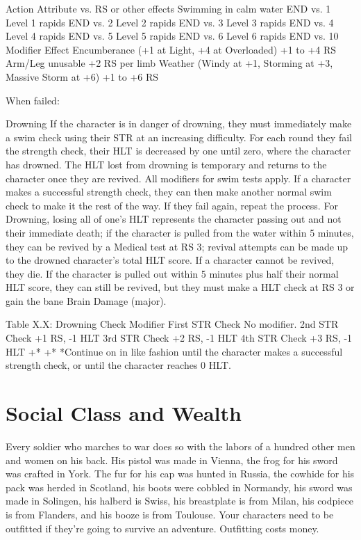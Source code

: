 \documentclass[oneside,11pt,english]{book}
\begin{document}
Action Attribute vs. RS or other effects 
Swimming in calm water END vs. 1 
Level 1 rapids END vs. 2 
Level 2 rapids END vs. 3 
Level 3 rapids END vs. 4 
Level 4 rapids END vs. 5 
Level 5 rapids END vs. 6 
Level 6 rapids END vs. 10 
Modifier Effect 
Encumberance (+1 at Light, +4 at Overloaded) +1 to +4 RS 
Arm/Leg unusable +2 RS per limb 
Weather (Windy at +1, Storming at +3, Massive Storm at +6) +1 to +6 RS 


When failed:

Drowning
If the character is in danger of drowning, they must immediately make a swim check using their STR at an increasing difficulty. For each round they fail the strength check, their HLT is decreased by one until zero, where the character has drowned. The HLT lost from drowning is temporary and returns to the character once they are revived. All modifiers for swim tests apply. If a character makes a successful strength check, they can then make another normal swim check to make it the rest of the way. If they fail again, repeat the process. For Drowning, losing all of one’s HLT represents the character passing out and not their immediate death; if the character is pulled from the water within 5 minutes, they can be revived by a Medical test at RS 3; revival attempts can be made up to the drowned character’s total HLT score. If a character cannot be revived, they die. If the character is pulled out within 5 minutes plus half their normal HLT score, they can still be revived, but they must make a HLT check at RS 3 or gain the bane Brain Damage (major).


Table X.X: Drowning %
Check Modifier 
First STR Check No modifier. 
2nd STR Check +1 RS, -1 HLT 
3rd STR Check +2 RS, -1 HLT 
4th STR Check +3 RS, -1 HLT 
+* +* 
*Continue on in like fashion until the character makes a successful strength check, or until the character 
reaches 0 HLT. 

\chapter{Social Class and Wealth}\label{ch:wealth}
\startcontents[chapters]
\clearpage
Every soldier who marches to war does so with the labors of a hundred other men and women on his back. His pistol was made in Vienna, the frog for his sword was crafted in York. The fur for his cap was hunted in Russia, the cowhide for his pack was herded in Scotland, his boots were cobbled in Normandy, his sword was made in Solingen, his halberd is Swiss, his breastplate is from Milan, his codpiece is from Flanders, and his booze is from Toulouse. Your characters need to be outfitted if they’re going to survive an adventure. Outfitting costs money.
\end{document}
